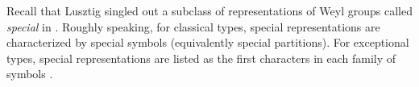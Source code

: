 \documentclass[reqno,12pt]{amsart}
\numberwithin{equation}{section}
\theoremstyle{plain}
\newtheorem{Prop}[Thm]{Proposition}
\theoremstyle{definition}
\begin{document}
Recall that Lusztig singled out a subclass of representations of Weyl groups called \emph{special} in \cite{lusztig1984char}. Roughly speaking, for classical types, special representations are characterized by special symbols (equivalently special partitions). For exceptional types, special representations are listed as the first characters in each family of symbols \cite[Chap. 4]{lusztig1984char}.
\end{document}
